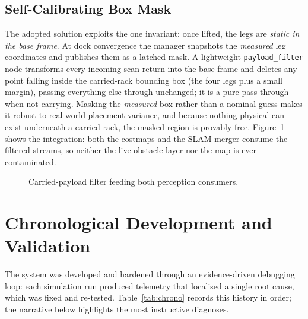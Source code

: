 \documentclass[11pt,a4paper]{article}
\newcommand{\code}[1]{\texttt{\small #1}}
\begin{document}
\subsection{Self-Calibrating Box Mask}
The adopted solution exploits the one invariant: once lifted, the legs are
\emph{static in the base frame}. At dock convergence the manager snapshots
the \emph{measured} leg coordinates and publishes them as a latched mask. A
lightweight \code{payload\_filter} node transforms every incoming scan return
into the base frame and deletes any point falling inside the carried-rack
bounding box (the four legs plus a small margin), passing everything else
through unchanged; it is a pure pass-through when not carrying. Masking the
\emph{measured} box rather than a nominal guess makes it robust to real-world
placement variance, and because nothing physical can exist underneath a
carried rack, the masked region is provably free.
Figure~\ref{fig:filter} shows the integration: both the costmaps and the SLAM
merger consume the filtered streams, so neither the live obstacle layer nor
the map is ever contaminated.

\begin{figure}[h]\centering
{}
\caption{Carried-payload filter feeding both perception consumers.}
\label{fig:filter}
\end{figure}

\section{Chronological Development and Validation}\label{sec:chrono}
The system was developed and hardened through an evidence-driven debugging
loop: each simulation run produced telemetry that localised a single root
cause, which was fixed and re-tested. Table~\ref{tab:chrono} records this
history in order; the narrative below highlights the most instructive
diagnoses.
\end{document}
